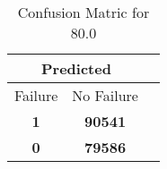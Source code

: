 \begin{table}[] 
\caption{Confusion Matric for 80.0} 
\label{Table: Prediction Accuracy-DMD80.0OnlySunEKF-ignoreReflection500.9EKF-top2-Reflection} 
\centering 
\begin{tabular} 
 {@{}ccc@{}} 
\toprule 
\multicolumn{2}{c}{\textbf{Predicted}}
 \\ \midrule 
\multicolumn{1}{|c|}{Failure} & 
\multicolumn{1}{c|}{No Failure}
 \\ \midrule 
\multicolumn{1}{|c|}{\color{green}\textbf{1}} & 
\multicolumn{1}{c|}{\color{green}\textbf{90541}}
 \\ \midrule 
\multicolumn{1}{|c|}{\color{red}\textbf{0}} & 
\multicolumn{1}{c|}{\color{red}\textbf{79586}}
 \\ \bottomrule 
\end{tabular} 
\end{table} 
